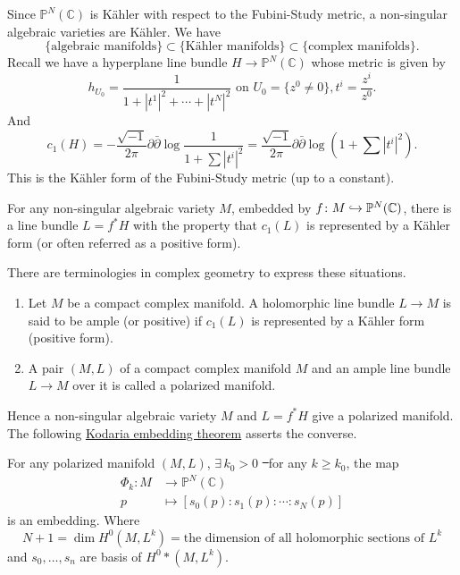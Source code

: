 \documentclass[12pt]{article}
\begin{document}
Since \(\mathbb{P}^N(\mathbb{C})\) is K\"ahler with respect to the Fubini-Study metric,
a non-singular algebraic varieties are K\"ahler. We have \[
  \{\text{algebraic manifolds}\}\subset \{\text{K\"ahler manifolds}\}
  \subset \{\text{complex manifolds}\}
.\] Recall we have a hyperplane line bundle \(H\to \mathbb{P}^N(\mathbb{C})\) whose
metric is given by \[
  h_{U_0}=\frac{1}{1+|t^1|^2+\cdots +|t^N|^2}\text{ on }U_0=\{z^0\neq 0\},
  t^i=\frac{z^i}{z^0}
.\] And \[
  c_1(H)=-\frac{\sqrt{-1}}{2\pi}\partial\bar{\partial}\log \frac{1}{1+\sum |t^i|^2}
  =\frac{\sqrt{-1}}{2\pi}\partial\bar{\partial}\log(1+\sum |t^i|^2)
.\] This is the K\"ahler form of the Fubini-Study metric (up to a constant).

For any non-singular algebraic variety \(M\), embedded by \(f\colon M\hookrightarrow
\mathbb{P}^N(\mathbb{C})\), there is a line bundle \(L=f^*H\) with the property that
\(c_1(L)\) is represented by a K\"ahler form (or often referred as a positive form).

There are terminologies in complex geometry to express these situations.
\begin{definition}\hfill
\begin{enumerate}[(1)]
\item Let \(M\) be a compact complex manifold. A holomorphic line bundle \(L\to M\)
  is said to be ample (or positive) if \(c_1(L)\) is represented by a K\"ahler
  form (positive form).
\item A pair \((M,L)\) of a compact complex manifold \(M\) and an ample line bundle
  \(L\to M\) over it is called a polarized manifold.
\end{enumerate}
\end{definition}

Hence a non-singular algebraic variety \(M\) and \(L=f^*H\) give a polarized
manifold. The following \underline{Kodaria embedding theorem} asserts the converse.

\begin{theorem}
For any polarized manifold \((M,L)\), \(\exists\,k_0>0\) \st\ for any \(k\ge k_0\),
the map
\begin{align*}
  \Phi_k\colon M &\longrightarrow \mathbb{P}^N(\mathbb{C}) \\
  p &\longmapsto [s_0(p):s_1(p):\cdots :s_N(p)]
\end{align*}
is an embedding. Where \[
  N+1=\dim H^0(M,L^k)=\text{the dimension of all holomorphic sections of }L^k
\] and \(s_0,\ldots,s_n\) are basis of \(H^0*(M,L^k)\).
\end{theorem}
\end{document}
